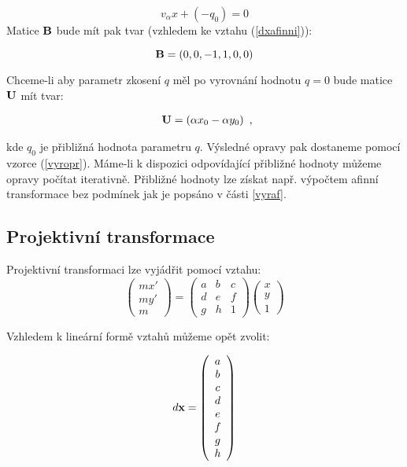 $$ v_\alpha{x} + (-q_0) = 0$$
Matice $\bf B$ bude mít pak tvar (vzhledem ke vztahu (\ref{dxafinni})):

$$ {\bf B} = \left(0,0,-1,1,0,0\right) $$ 

Chceme-li aby parametr zkosení $q$ měl po vyrovnání hodnotu $q = 0$ bude matice 
${\bf U}$ mít tvar:

$$
\begin{array}{c}
{\bf U} = \left(
\alpha{x}_0 -\alpha{y}_0
\right)
\end{array},
$$ 

kde $q_0$ je přibližná hodnota parametru $q$. Výsledné opravy pak dostaneme
pomocí vzorce (\ref{vyropr}). Máme-li k dispozici odpovídající přibližné hodnoty
můžeme opravy počítat iterativně. Přibližné hodnoty lze získat např. výpočtem
afinní transformace bez podmínek jak je popsáno v části \ref{vyraf}.

\subsection{Projektivní transformace}

Projektivní transformaci lze vyjádřit pomocí vztahu:
$$
\left(
\begin{array}{c}
mx'\\
my'\\ 
m
\end{array}
\right) 
= 
\left(
\begin{array}{ccc}
a & b &  c\\
d &  e & f\\ 
g & h & 1
\end{array}
\right) 
\left(
\begin{array}{c}
x\\
y\\ 
1
\end{array}
\right) 
$$

Vzhledem k lineární formě vztahů můžeme opět zvolit:

$$ d{\bf x} =
\left(
\begin{array}{c}
a\\
b\\
c\\
d\\
e\\
f\\
g\\
h
\end{array}
\right) $$

